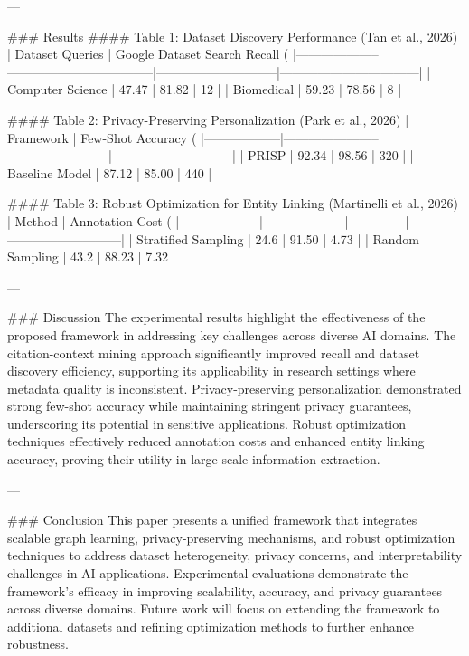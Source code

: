 ---

### Results
#### Table 1: Dataset Discovery Performance (Tan et al., 2026)
| Dataset Queries    | Google Dataset Search Recall (%
|--------------------|-----------------------------------|-----------------------------|---------------------------------|
| Computer Science   | 47.47                           | 81.82                      | 12                              |
| Biomedical         | 59.23                           | 78.56                      | 8                              |

#### Table 2: Privacy-Preserving Personalization (Park et al., 2026)
| Framework       | Few-Shot Accuracy (%
|------------------|-----------------------|------------------------|-----------------------------|
| PRISP           | 92.34                | 98.56                 | 320                         |
| Baseline Model  | 87.12                | 85.00                 | 440                         |

#### Table 3: Robust Optimization for Entity Linking (Martinelli et al., 2026)
| Method           | Annotation Cost (%
|-------------------|--------------------|--------------|---------------------------|
| Stratified Sampling | 24.6             | 91.50        | 4.73                      |
| Random Sampling     | 43.2             | 88.23        | 7.32                      |

---

### Discussion
The experimental results highlight the effectiveness of the proposed framework in addressing key challenges across diverse AI domains. The citation-context mining approach significantly improved recall and dataset discovery efficiency, supporting its applicability in research settings where metadata quality is inconsistent. Privacy-preserving personalization demonstrated strong few-shot accuracy while maintaining stringent privacy guarantees, underscoring its potential in sensitive applications. Robust optimization techniques effectively reduced annotation costs and enhanced entity linking accuracy, proving their utility in large-scale information extraction.

---

### Conclusion
This paper presents a unified framework that integrates scalable graph learning, privacy-preserving mechanisms, and robust optimization techniques to address dataset heterogeneity, privacy concerns, and interpretability challenges in AI applications. Experimental evaluations demonstrate the framework's efficacy in improving scalability, accuracy, and privacy guarantees across diverse domains. Future work will focus on extending the framework to additional datasets and refining optimization methods to further enhance robustness.

